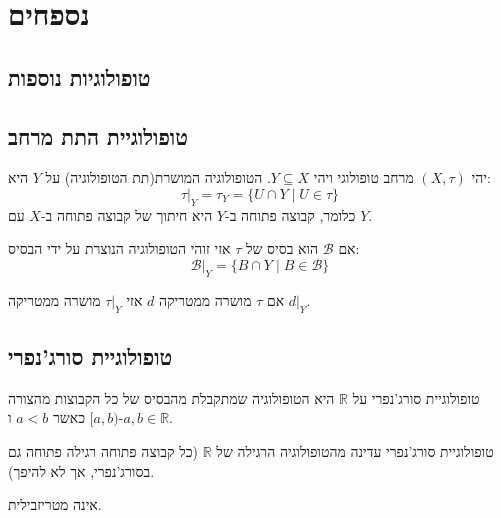 \documentclass{tstextbook}
\begin{document}
  \chapter{נספחים}

\section{טופולוגיות נוספות}

\section{טופולוגיית התת מרחב}

\begin{definition}
יהי \(\left( X,\tau \right)\) מרחב טופולוגי ויהי \(Y\subseteq X\). הטופולוגיה המושרת(תת הטופולוגיה) על \(Y\) היא:
$$\tau|_Y = \tau_Y = \{ U \cap Y \mid U \in \tau \}$$
כלומר, קבוצה פתוחה ב-\(Y\) היא חיתוך של קבוצה פתוחה ב-\(X\) עם \(Y\).

\end{definition}
\begin{proposition}
אם \(\mathcal{B}\) הוא בסיס של \(\tau\) אזי זוהי הטופולוגיה הנוצרת על ידי הבסיס:
$$\mathcal{B}|_{Y}=\{ B\cap Y\mid B \in \mathcal{B} \}$$

\end{proposition}
\begin{proposition}
אם \(\tau\) מושרה ממטריקה \(d\) אזי \(\tau|_{Y}\) מושרה ממטריקה \(d|_{Y}\).

\end{proposition}
\section{טופולוגיית סורג'נפרי}

\begin{definition}
טופולוגיית סורג'נפרי על \(\mathbb{R}\) היא הטופולוגיה שמתקבלת מהבסיס של כל הקבוצות מהצורה \([a, b)\) כאשר \(a < b\) ו-\(a, b \in \mathbb{R}\).

\end{definition}
\begin{proposition}
טופולוגיית סורג'נפרי עדינה מהטופולוגיה הרגילה של \(\mathbb{R}\) (כל קבוצה פתוחה רגילה פתוחה גם בסורג'נפרי, אך לא להיפך).

\end{proposition}
\begin{proposition}
אינה מטריזבילית.

\end{proposition}
\end{document}
